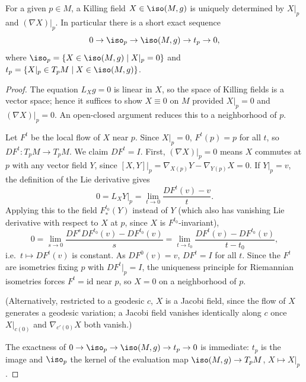 \begin{proposition}[Proposition 8.1.4]
  \label{prop:pet-ch8-killing-uniqueness}
  For a given $p\in M$, a Killing field $X\in\iso(M,g)$ is uniquely determined by
  $X|_p$ and $(\nabla X)|_p$. In particular there is a short exact sequence
  \[
    0\to\iso_p\to\iso(M,g)\to t_p\to0,
  \]
  where $\iso_p=\{X\in\iso(M,g)\mid X|_p=0\}$ and
  $t_p=\{X|_p\in T_pM\mid X\in\iso(M,g)\}$.
\end{proposition}
\begin{proof}
  The equation $L_Xg=0$ is linear in $X$, so the space of Killing fields is a
  vector space; hence it suffices to show $X\equiv0$ on $M$ provided $X|_p=0$
  and $(\nabla X)|_p=0$. An open-closed argument reduces this to a neighborhood
  of $p$.

  Let $F^t$ be the local flow of $X$ near $p$. Since $X|_p=0$, $F^t(p)=p$ for all
  $t$, so $DF^t:T_pM\to T_pM$. We claim $DF^t=I$. First, $(\nabla X)|_p=0$ means
  $X$ commutes at $p$ with any vector field $Y$, since
  $[X,Y]|_p=\nabla_{X(p)}Y-\nabla_{Y(p)}X=0$. If $Y|_p=v$, the definition of the
  Lie derivative gives
  \[
    0=L_XY|_p=\lim_{t\to0}\frac{DF^t(v)-v}{t}.
  \]
  Applying this to the field $F^{t_0}_*(Y)$ instead of $Y$ (which also has
  vanishing Lie derivative with respect to $X$ at $p$, since $X$ is $F^{t_0}$-invariant),
  \[
    0=\lim_{s\to0}\frac{DF^sDF^{t_0}(v)-DF^{t_0}(v)}{s}
    =\lim_{t\to t_0}\frac{DF^t(v)-DF^{t_0}(v)}{t-t_0},
  \]
  i.e.\ $t\mapsto DF^t(v)$ is constant. As $DF^0(v)=v$, $DF^t=I$ for all $t$.
  Since the $F^t$ are isometries fixing $p$ with $DF^t|_p=I$, the uniqueness
  principle for Riemannian isometries forces $F^t=\mathrm{id}$ near $p$, so
  $X=0$ on a neighborhood of $p$.

  (Alternatively, restricted to a geodesic $c$, $X$ is a Jacobi field, since the
  flow of $X$ generates a geodesic variation; a Jacobi field vanishes identically
  along $c$ once $X|_{c(0)}$ and $\nabla_{c'(0)}X$ both vanish.)

  The exactness of $0\to\iso_p\to\iso(M,g)\to t_p\to0$ is immediate: $t_p$ is
  the image and $\iso_p$ the kernel of the evaluation map $\iso(M,g)\to T_pM$,
  $X\mapsto X|_p$.
\end{proof}

